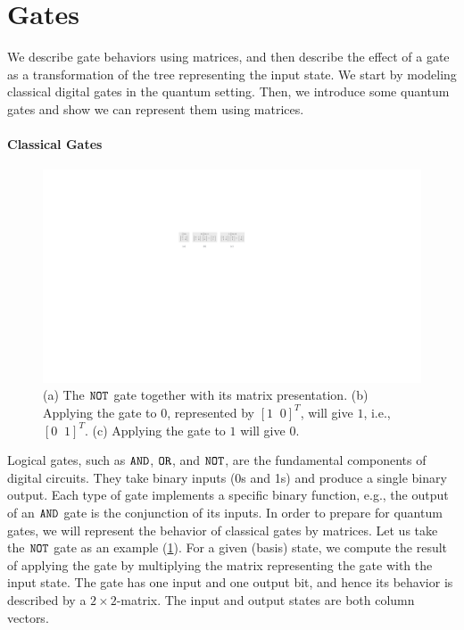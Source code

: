 \section{Gates} 
We describe gate behaviors using matrices, and then describe the effect of a gate as a transformation of the tree representing the input state.
%
We start by modeling classical digital gates in the quantum setting.
%
Then, we introduce some quantum gates and show we can represent them using matrices.

\paragraph{Classical Gates}
\begin{figure} 
\includegraphics[]{Figures/Gates/not} 
\caption{(a) The $\mathtt{NOT}$ gate together with its matrix presentation.
(b) Applying the gate to $0$, represented by $[1\;\;0]^T$, will give $1$, i.e., $[0\;\;1]^T$.
(c) Applying the gate to $1$ will give $0$.}
\label{not:gate:fig}
\end{figure}
%
Logical gates, such as $\mathtt{AND}$, $\mathtt{OR}$, and $\mathtt{NOT}$, are the fundamental components of digital circuits. 
%
They take binary inputs (0s and 1s) and produce a single binary output.
%
Each type of gate implements a specific binary function, e.g., the output of an $\mathtt{AND}$ gate is the conjunction of its inputs.
%
In order to prepare for quantum gates, we will represent the behavior of classical gates by matrices.
%
Let us take the $\mathtt{NOT}$ gate as an example (\cref{not:gate:fig}).
%
For a given (basis) state, we compute the result of applying the gate by multiplying the matrix representing the gate with the input state.
%
%
The gate has one input and one output bit, and hence its behavior is described by a $2\times2$-matrix.
%
The input and output states are both column vectors.

